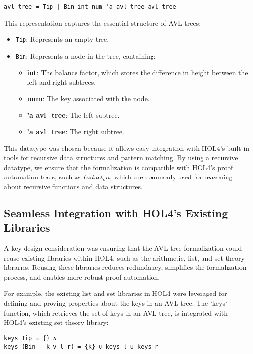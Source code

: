 \documentclass[12pt]{article}
\begin{document}
\begin{itemize}
\begin{verbatim}
avl_tree = Tip | Bin int num 'a avl_tree avl_tree
\end{verbatim}

This representation captures the essential structure of AVL trees:
\begin{itemize}
    \item \texttt{Tip}: Represents an empty tree.
    \item \texttt{Bin}: Represents a node in the tree, containing:
        \begin{itemize}
            \item \textbf{int}: The balance factor, which stores the difference in height between the left and right subtrees.
            \item \textbf{num}: The key associated with the node.
            \item \textbf{'a avl\_tree}: The left subtree.
            \item \textbf{'a avl\_tree}: The right subtree.
        \end{itemize}
\end{itemize}

This datatype was chosen because it allows easy integration with HOL4’s built-in tools for recursive data structures and pattern matching. By using a recursive datatype, we ensure that the formalization is compatible with HOL4's proof automation tools, such as  \( Induct_on \), which are commonly used for reasoning about recursive functions and data structures.

\subsection{Seamless Integration with HOL4’s Existing Libraries}

A key design consideration was ensuring that the AVL tree formalization could reuse existing libraries within HOL4, such as the arithmetic, list, and set theory libraries. Reusing these libraries reduces redundancy, simplifies the formalization process, and enables more robust proof automation.

For example, the existing list and set libraries in HOL4 were leveraged for defining and proving properties about the keys in an AVL tree. The `keys` function, which retrieves the set of keys in an AVL tree, is integrated with HOL4’s existing set theory library:

\begin{verbatim}
keys Tip = {} ∧  
keys (Bin _ k v l r) = {k} ∪ keys l ∪ keys r
\end{verbatim}


\end{itemize}
\end{document}
